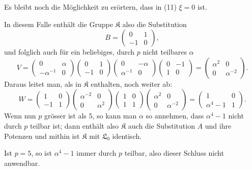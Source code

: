 \documentclass[11pt]{article}
\providecommand{\Lzero}{\mathfrak L_0}
\providecommand{\Kgrp}{\mathfrak K}
\begin{document}
Es bleibt noch die Möglichkeit zu erörtern, dass in (11) $\xi=0$ ist.

In diesem Falle enthält die Gruppe $\Kgrp$ also die Substitution
\[
 B=\begin{pmatrix}0&1\\-1&0\end{pmatrix},
\]
und folglich auch für ein beliebiges, durch $p$ nicht teilbares $\alpha$
\[
 V=\begin{pmatrix}0&\alpha\\-\alpha^{-1}&0\end{pmatrix}
 \begin{pmatrix}0&1\\-1&0\end{pmatrix}
 \begin{pmatrix}0&-\alpha\\\alpha^{-1}&0\end{pmatrix}
 \begin{pmatrix}0&-1\\1&0\end{pmatrix}
 =\begin{pmatrix}\alpha^2&0\\0&\alpha^{-2}\end{pmatrix}.
\]
Daraus leitet man, als in $\Kgrp$ enthalten, noch weiter ab:
\[
 W=\begin{pmatrix}1&0\\-1&1\end{pmatrix}
 \begin{pmatrix}\alpha^{-2}&0\\0&\alpha^2\end{pmatrix}
 \begin{pmatrix}1&0\\1&1\end{pmatrix}
 \begin{pmatrix}\alpha^2&0\\0&\alpha^{-2}\end{pmatrix}
 =\begin{pmatrix}1&0\\ \alpha^4-1&1\end{pmatrix}.
\]
Wenn nun $p$ grösser ist als $5$, so kann man $\alpha$ so annehmen, dass $\alpha^4-1$ nicht durch $p$ teilbar ist; dann enthält also $\Kgrp$ auch die Substitution $A$ und ihre Potenzen und mithin ist $\Kgrp$ mit $\Lzero$ identisch.

Ist $p=5$, so ist $\alpha^4-1$ immer durch $p$ teilbar, also dieser Schluss nicht anwendbar.
\end{document}
